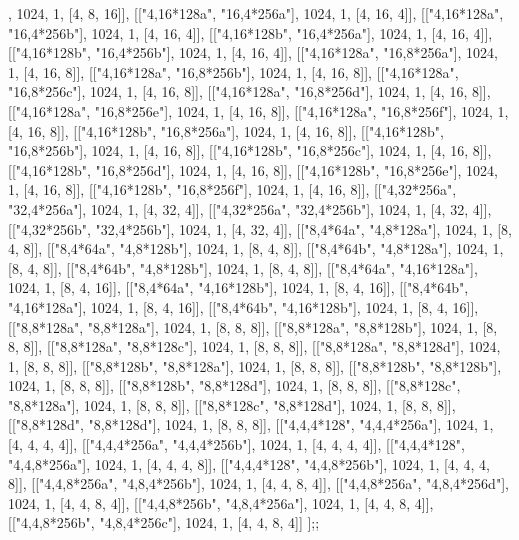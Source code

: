 \documentclass[11pt,a4paper]{article}
\begin{document}
\begin{CompleteProgram}
[["{4,8}*64b", "{8,16}*256f"], 1024, 1, [4, 8, 16]],
[["{4,16}*128a", "{16,4}*256a"], 1024, 1, [4, 16, 4]],
[["{4,16}*128a", "{16,4}*256b"], 1024, 1, [4, 16, 4]],
[["{4,16}*128b", "{16,4}*256a"], 1024, 1, [4, 16, 4]],
[["{4,16}*128b", "{16,4}*256b"], 1024, 1, [4, 16, 4]],
[["{4,16}*128a", "{16,8}*256a"], 1024, 1, [4, 16, 8]],
[["{4,16}*128a", "{16,8}*256b"], 1024, 1, [4, 16, 8]],
[["{4,16}*128a", "{16,8}*256c"], 1024, 1, [4, 16, 8]],
[["{4,16}*128a", "{16,8}*256d"], 1024, 1, [4, 16, 8]],
[["{4,16}*128a", "{16,8}*256e"], 1024, 1, [4, 16, 8]],
[["{4,16}*128a", "{16,8}*256f"], 1024, 1, [4, 16, 8]],
[["{4,16}*128b", "{16,8}*256a"], 1024, 1, [4, 16, 8]],
[["{4,16}*128b", "{16,8}*256b"], 1024, 1, [4, 16, 8]],
[["{4,16}*128b", "{16,8}*256c"], 1024, 1, [4, 16, 8]],
[["{4,16}*128b", "{16,8}*256d"], 1024, 1, [4, 16, 8]],
[["{4,16}*128b", "{16,8}*256e"], 1024, 1, [4, 16, 8]],
[["{4,16}*128b", "{16,8}*256f"], 1024, 1, [4, 16, 8]],
[["{4,32}*256a", "{32,4}*256a"], 1024, 1, [4, 32, 4]],
[["{4,32}*256a", "{32,4}*256b"], 1024, 1, [4, 32, 4]],
[["{4,32}*256b", "{32,4}*256b"], 1024, 1, [4, 32, 4]],
[["{8,4}*64a", "{4,8}*128a"], 1024, 1, [8, 4, 8]],
[["{8,4}*64a", "{4,8}*128b"], 1024, 1, [8, 4, 8]],
[["{8,4}*64b", "{4,8}*128a"], 1024, 1, [8, 4, 8]],
[["{8,4}*64b", "{4,8}*128b"], 1024, 1, [8, 4, 8]],
[["{8,4}*64a", "{4,16}*128a"], 1024, 1, [8, 4, 16]],
[["{8,4}*64a", "{4,16}*128b"], 1024, 1, [8, 4, 16]],
[["{8,4}*64b", "{4,16}*128a"], 1024, 1, [8, 4, 16]],
[["{8,4}*64b", "{4,16}*128b"], 1024, 1, [8, 4, 16]],
[["{8,8}*128a", "{8,8}*128a"], 1024, 1, [8, 8, 8]],
[["{8,8}*128a", "{8,8}*128b"], 1024, 1, [8, 8, 8]],
[["{8,8}*128a", "{8,8}*128c"], 1024, 1, [8, 8, 8]],
[["{8,8}*128a", "{8,8}*128d"], 1024, 1, [8, 8, 8]],
[["{8,8}*128b", "{8,8}*128a"], 1024, 1, [8, 8, 8]],
[["{8,8}*128b", "{8,8}*128b"], 1024, 1, [8, 8, 8]],
[["{8,8}*128b", "{8,8}*128d"], 1024, 1, [8, 8, 8]],
[["{8,8}*128c", "{8,8}*128a"], 1024, 1, [8, 8, 8]],
[["{8,8}*128c", "{8,8}*128d"], 1024, 1, [8, 8, 8]],
[["{8,8}*128d", "{8,8}*128d"], 1024, 1, [8, 8, 8]],
[["{4,4,4}*128", "{4,4,4}*256a"], 1024, 1, [4, 4, 4, 4]],
[["{4,4,4}*256a", "{4,4,4}*256b"], 1024, 1, [4, 4, 4, 4]],
[["{4,4,4}*128", "{4,4,8}*256a"], 1024, 1, [4, 4, 4, 8]],
[["{4,4,4}*128", "{4,4,8}*256b"], 1024, 1, [4, 4, 4, 8]],
[["{4,4,8}*256a", "{4,8,4}*256b"], 1024, 1, [4, 4, 8, 4]],
[["{4,4,8}*256a", "{4,8,4}*256d"], 1024, 1, [4, 4, 8, 4]],
[["{4,4,8}*256b", "{4,8,4}*256a"], 1024, 1, [4, 4, 8, 4]],
[["{4,4,8}*256b", "{4,8,4}*256c"], 1024, 1, [4, 4, 8, 4]]
];;
\end{CompleteProgram}
\end{document}
